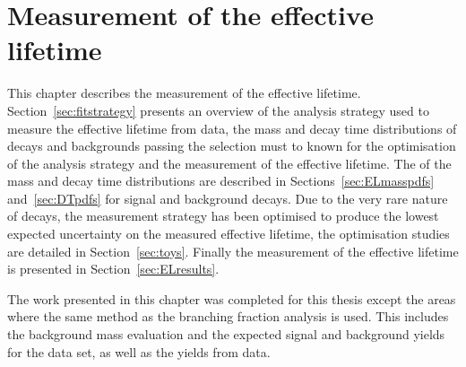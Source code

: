 \chapter{Measurement of the \bsmumu effective lifetime}
\label{sec:lifetimemeasurement}

This chapter describes the measurement of the \bsmumu effective lifetime. %
Section~\ref{sec:fitstrategy} presents an overview of the analysis strategy used to measure the \bsmumu effective lifetime from data, the mass and decay time distributions of \bsmumu decays and backgrounds passing the selection must to known for the optimisation of the analysis strategy and the measurement of the effective lifetime. The \pdfs of the mass and decay time distributions are described in Sections~\ref{sec:ELmasspdfs} and~\ref{sec:DTpdfs} for signal and background decays. Due to the very rare nature of \bsmumu decays, the measurement strategy has been optimised to produce the lowest expected uncertainty on the measured \bsmumu effective lifetime, the optimisation studies are detailed in Section~\ref{sec:toys}. Finally the measurement of the \bsmumu effective lifetime is presented in Section~\ref{sec:ELresults}.





The work presented in this chapter was completed for this thesis except the areas where the same method as the branching fraction analysis is used. This includes the background mass \pdf evaluation and the expected signal and background yields for the data set, as well as the \bsjpisphi yields from data. 


